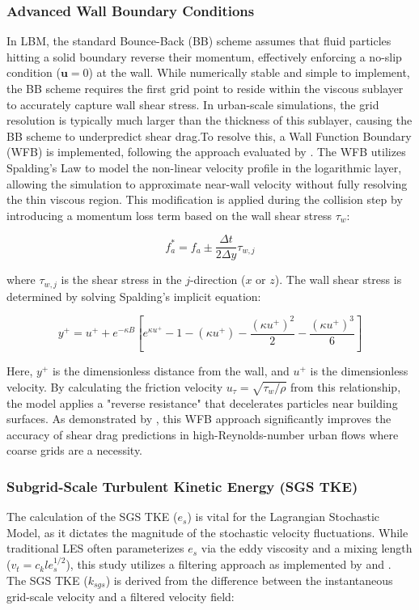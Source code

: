\subsubsection{Advanced Wall Boundary Conditions}
In LBM, the standard Bounce-Back (BB) scheme assumes that fluid particles hitting a solid boundary reverse their momentum, effectively enforcing a no-slip condition ($\mathbf{u}=0$) at the wall. While numerically stable and simple to implement, the BB scheme requires the first grid point to reside within the viscous sublayer to accurately capture wall shear stress. In urban-scale simulations, the grid resolution is typically much larger than the thickness of this sublayer, causing the BB scheme to underpredict shear drag.To resolve this, a Wall Function Boundary (WFB) is implemented, following the approach evaluated by \textcite{Han2021WFB}. The WFB utilizes Spalding's Law to model the non-linear velocity profile in the logarithmic layer, allowing the simulation to approximate near-wall velocity without fully resolving the thin viscous region. This modification is applied during the collision step by introducing a momentum loss term based on the wall shear stress $\tau_w$:

\begin{equation}
    f_a^* = f_a \pm \frac{\Delta t}{2\Delta y}\tau_{w,j}
\end{equation}

where $\tau_{w,j}$ is the shear stress in the $j$-direction ($x$ or $z$). The wall shear stress is determined by solving Spalding's implicit equation:

\begin{equation}
    y^+ = u^+ + e^{-\kappa B} \left[ e^{\kappa u^+} - 1 - (\kappa u^+) - \frac{(\kappa u^+)^2}{2} - \frac{(\kappa u^+)^3}{6} \right]
\end{equation}

Here, $y^+$ is the dimensionless distance from the wall, and $u^+$ is the dimensionless velocity. By calculating the friction velocity $u_{\tau} = \sqrt{\tau_w / \rho}$ from this relationship, the model applies a "reverse resistance" that decelerates particles near building surfaces. As demonstrated by \textcite{Han2021WFB}, this WFB approach significantly improves the accuracy of shear drag predictions in high-Reynolds-number urban flows where coarse grids are a necessity.

\subsubsection{Subgrid-Scale Turbulent Kinetic Energy (SGS TKE)}
The calculation of the SGS TKE ($e_s$) is vital for the Lagrangian Stochastic Model, as it dictates the magnitude of the stochastic velocity fluctuations. While traditional LES often parameterizes $e_s$ via the eddy viscosity and a mixing length ($v_t = c_k l e_s^{1/2}$), this study utilizes a filtering approach as implemented by \textcite{Suga2015D3Q27} and \textcite{Yokouchi2020Simulation}. The SGS TKE ($k_{sgs}$) is derived from the difference between the instantaneous grid-scale velocity and a filtered velocity field:

